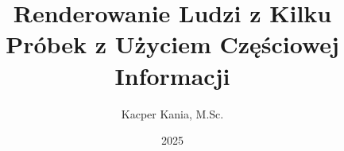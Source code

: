 \documentclass{diploma}
\title{Renderowanie Ludzi z Kilku Próbek z Użyciem Częściowej Informacji}
\author{Kacper Kania, M.Sc.}
\date{2025}
\begin{document}
\frontpages

% 



\acronymslist
\end{document}
